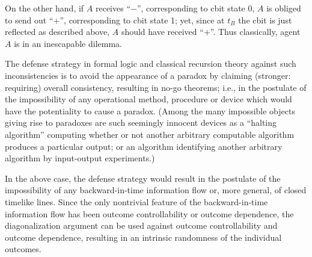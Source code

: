 On the other hand,
if $A$
receives ``$-$'', corresponding to cbit state 0,
 $A$ is obliged to send out ``$+$'', corresponding to cbit state 1;
yet, since at $t_B$ the cbit is just
reflected as described above,
$A$ should have received ``$+$''.
Thus classically, agent $A$ is in an inescapable dilemma.

The defense strategy in formal logic and classical recursion theory
against such inconsistencies is
to avoid the appearance of a paradox by claiming (stronger: requiring)
overall consistency, resulting in no-go theorems; i.e., in the
postulate of the impossibility of any operational method, procedure or
device which would have the potentiality to cause a paradox.
(Among the many impossible objects giving rise to paradoxes are
such seemingly innocent devices as a
``halting
 algorithm'' computing whether or not another
arbitrary computable algorithm produces a particular output;
or an algorithm identifying
another arbitrary algorithm by input-output experiments.)

In the above case, the defense strategy would result in the postulate of
the impossibility of any
backward-in-time
information flow or, more general,
of closed timelike lines.
Since the only nontrivial feature of the backward-in-time
information flow has been outcome controllability or outcome dependence,
the diagonalization
argument can be used against outcome controllability and outcome
dependence, resulting in an
intrinsic randomness of the individual outcomes.

